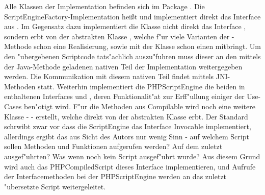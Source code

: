 Alle Klassen der Implementation befinden sich im Package . 
Die ScriptEngineFactory-Implementation hei\ss t  und implementiert direkt das Interface 
 aus . Im Gegensatz dazu implementiert die Klasse  nicht
direkt das Interface , sondern erbt von der abstrakten Klasse , welche f"ur
viele Varianten der -Methode schon eine Realisierung, sowie mit der Klasse  schon einen 
 mitbringt. Um den "ubergebenen Scriptcode tats"achlich auszu"fuhren muss dieser an den mittels der Java-Methode
 geladenen nativen Teil der Implementation weitergegeben werden. Die Kommunikation mit diesem
nativen Teil findet mittels JNI-Methoden statt.
Weiterhin implementiert die PHPScriptEngine die beiden in  enthaltenen Interfaces  und
, deren Funktionalit"at zur Erff"ullung einiger der Use-Cases ben"otigt wird. F"ur die Methoden aus
Compilable wird noch eine weitere Klasse -  - erstellt, welche direkt von der abstrakten
Klasse  erbt.
Der Standard schrwibt zwar vor dass die ScriptEngine das Interface Invocable implementiert, allerdings ergibt das aus Sicht
des Autors nur wenig Sinn - auf welchem Script sollen Methoden und Funktionen aufgerufen werden? Auf dem zuletzt ausgef"uhrten?
Was wenn noch kein Script ausgef"uhrt wurde? Aus diesem Grund wird auch das PHPCompiledScript dieses Interface implementieren,
und Aufrufe der Interfacemethoden bei der PHPScriptEngine werden an das zuletzt "ubersetzte Script weitergeleitet.

